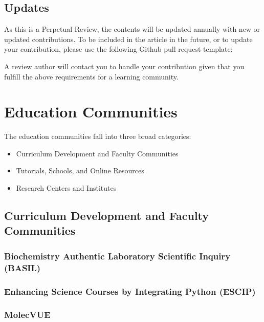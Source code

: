 \documentclass[9pt,review]{livecoms}
\begin{document}
\subsection{Updates}
As this is a Perpetual Review, the contents will be updated annually with new or updated contributions. To be included in the article in the future, or to update your contribution, please use the following Github pull request template:


A review author will contact you to handle your contribution given that you fulfill the above requirements for a learning community. 

\section{Education Communities}

The education communities fall into three broad categories:
\begin{itemize}
    \item Curriculum Development and Faculty Communities
    \item Tutorials, Schools, and Online Resources
    \item Research Centers and Institutes
\end{itemize}

\subsection{Curriculum Development and Faculty Communities}

\subsubsection{Biochemistry Authentic Laboratory Scientific Inquiry (BASIL)}


\subsubsection{Enhancing Science Courses by Integrating Python (ESCIP)}


\subsubsection{MolecVUE}

\end{document}
